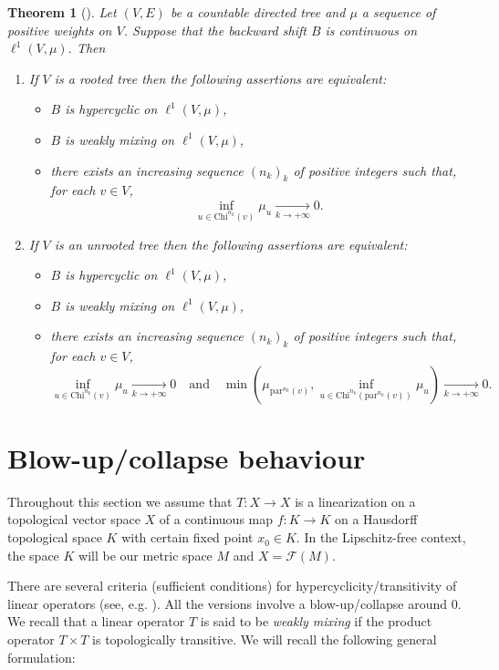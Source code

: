 \documentclass[12pt,english]{amsart}
\numberwithin{equation}{section}
\theoremstyle{plain}
\newtheorem{theorem}{Theorem}[section]
\theoremstyle{definition}
\def\pare{\text{par}}
\begin{document}
\begin{theorem}[\cite{GEPa23}]\label{caracshift}
Let $(V,E)$ be a countable directed tree and $\mu$ a sequence of positive weights on $V$. Suppose that the backward shift $B$ is continuous on $\ell^1(V,\mu)$. Then
\begin{enumerate}
\item If $V$ is a rooted tree then the following assertions are equivalent:
\begin{itemize}
\item $B$ is hypercyclic on $\ell^1(V,\mu)$,
\item $B$ is weakly mixing on $\ell^1(V,\mu)$,
\item there exists an increasing sequence $(n_k)_k$ of positive integers such that, for each $v\in V$,
\[\inf_{u\in \text{Chi}^{n_k}(v)}\mu_u\xrightarrow[k\to +\infty]{} 0.\]
\end{itemize}
\item If $V$ is an unrooted tree then the following assertions are equivalent:
\begin{itemize}
\item $B$ is hypercyclic on $\ell^1(V,\mu)$,
\item $B$ is weakly mixing on $\ell^1(V,\mu)$,
\item there exists an increasing sequence $(n_k)_k$ of positive integers such that, for each $v\in V$,
\[\inf_{u\in \text{Chi}^{n_k}(v)}\mu_u\xrightarrow[k\to +\infty]{} 0 \quad \text{and}\quad \min\left(\mu_{\pare^{n_k}(v)},\inf_{u\in \text{Chi}^{n_k}(\pare^{n_k}(v))}\mu_u\right)\xrightarrow[k\to +\infty]{} 0.\]
\end{itemize}
\end{enumerate}
\end{theorem}







\section{Blow-up/collapse behaviour}

Throughout this section we assume that $T\colon X\to X$ is a linearization on a topological vector space $X$ of a continuous map $f\colon K\to K$  on a Hausdorff topological space $K$ with certain fixed point $x_0\in K$. In the Lipschitz-free context, the space $K$ will be our metric space $M$ and  $X=\mathcal{F}(M)$.

There are several criteria (sufficient conditions) for hypercyclicity/transitivity of linear operators (see, e.g. \cite{GEP11}). All the versions involve a blow-up/collapse around $0$. We recall that a linear operator $T$ is said to be \textit{weakly mixing} if the product operator $T\times T$ is topologically transitive. We will recall the following general formulation: 
\end{document}
